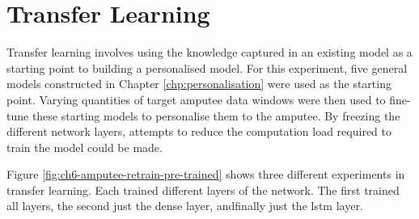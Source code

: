 \section{Transfer Learning}
\label{sec:amputee-transfer}
Transfer learning involves using the knowledge captured in an existing model as a starting point to building a personalised model. For this experiment, five general models constructed in Chapter \ref{chp:personalisation} were used as the starting point. Varying quantities of target amputee data windows were then used to fine-tune these starting models to personalise them to the amputee. By freezing the different network layers, attempts to reduce the computation load required to train the model could be made.

Figure \ref{fig:ch6-amputee-retrain-pre-trained} shows three different experiments in transfer learning. Each trained different layers of the network. The first trained all layers, the second just the dense layer, andfinally just the \acrshort{lstm} layer.

